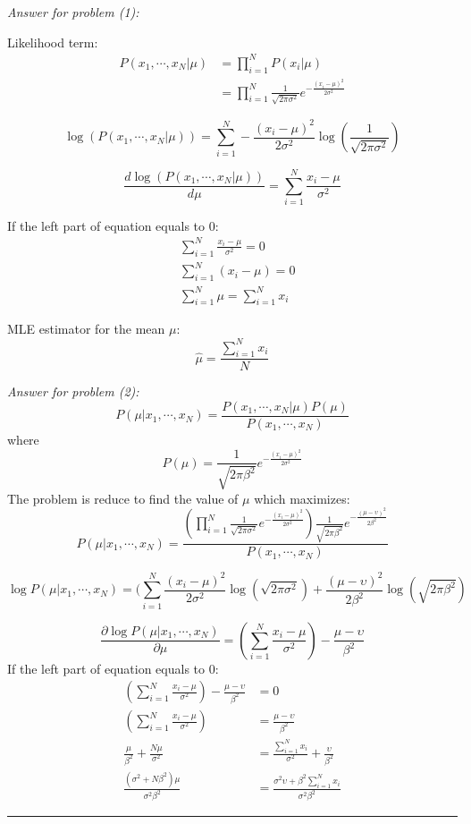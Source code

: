 \documentclass[twoside]{article}
\newenvironment{problem}[2][Problem]{\begin{trivlist}
		\item[\hskip \labelsep {\bfseries #1}\hskip \labelsep {\bfseries #2.}]}{\end{trivlist}}
\newenvironment{solution}{{\bf Solution:}}{\hfill\rule{2mm}{2mm}}
\begin{document}
\begin{problem}{2}
\end{problem} 
\begin{solution}
	
\emph{Answer for problem (1):}

Likelihood term:
\begin{align*}
P(x_1,\cdots,x_N|\mu) &= \prod_{i=1}^{N}P(x_i|\mu) \\
&=\prod_{i=1}^{N}\frac{1}{\sqrt{2\pi \sigma^2}}e^{-\frac{(x_i-\mu)^2}{2\sigma^2}}
\end{align*}

$$
\log(P(x_1,\cdots,x_N|\mu)) = \sum_{i=1}^{N}-\frac{(x_i-\mu)^2}{2\sigma^2}\log(\frac{1}{\sqrt{2\pi \sigma^2}})
$$

$$
\frac{d\log(P(x_1,\cdots,x_N|\mu))}{d\mu} = \sum_{i=1}^{N}\frac{x_i-\mu}{\sigma^2}
$$

If the left part of equation equals to 0:
\begin{align*}
&\sum_{i=1}^{N}\frac{x_i-\mu}{\sigma^2} = 0 \\
&\sum_{i=1}^{N}(x_i-\mu) = 0 \\
&\sum_{i=1}^{N}\mu = \sum_{i=1}^{N}x_i 
\end{align*}

MLE estimator for the mean $\mu$:
$$
\hat{\mu} = \frac{\sum_{i=1}^{N}x_i}{N}
$$

\emph{Answer for problem (2):}
$$
P(\mu|x_1,\cdots,x_N) = \frac{P(x_1,\cdots,x_N|\mu)P(\mu)}{P(x_1,\cdots,x_N)}
$$
where
$$
P(\mu) = \frac{1}{\sqrt{2\pi\beta^2}}e^{-\frac{(x_i-\mu)^2}{2\sigma^2}}
$$
The problem is reduce to find the value of $\mu$ which maximizes:
$$
P(\mu|x_1,\cdots,x_N) = \frac{(\prod_{i=1}^{N}\frac{1}{\sqrt{2\pi \sigma^2}}e^{-\frac{(x_i-\mu)^2}{2\sigma^2}})\frac{1}{\sqrt{2\pi\beta^2}}e^{-\frac{(\mu-\upsilon)^2}{2\beta^2}}}{P(x_1,\cdots,x_N)}
$$

$$
\log P(\mu|x_1,\cdots,x_N) = (\sum_{i=1}^{N}\frac{(x_i-\mu)^2}{2\sigma^2}\log(\sqrt{2\pi\sigma^2})+\frac{(\mu-\upsilon)^2}{2\beta^2}\log(\sqrt{2\pi\beta^2}) 
$$

$$
\frac{\partial\log P(\mu|x_1,\cdots,x_N)}{\partial\mu}=(\sum_{i=1}^{N}\frac{x_i-\mu}{\sigma^2})-\frac{\mu-\upsilon}{\beta^2}
$$
If the left part of equation equals to 0:
\begin{align*}
(\sum_{i=1}^{N}\frac{x_i-\mu}{\sigma^2})-\frac{\mu-\upsilon}{\beta^2} &= 0 \\
(\sum_{i=1}^{N}\frac{x_i-\mu}{\sigma^2}) &=\frac{\mu-\upsilon}{\beta^2} \\
\frac{\mu}{\beta^2}+\frac{N\mu}{\sigma^2} &= \frac{\sum_{i=1}^{N}x_i}{\sigma^2}+\frac{\upsilon}{\beta^2}  \\
\frac{(\sigma^2+N\beta^2)\mu}{\sigma^2\beta^2} &=\frac{\sigma^2\upsilon+\beta^2\sum_{i=1}^{N}x_i}{\sigma^2\beta^2}
\end{align*}


\end{solution}
\end{document}
